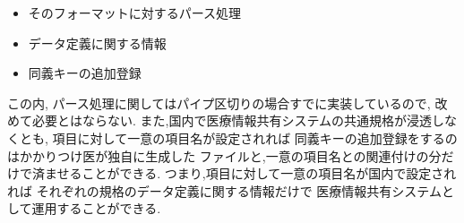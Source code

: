 	\begin{itemize}
		\item そのフォーマットに対するパース処理
		\item データ定義に関する情報
		\item  同義キーの追加登録
	\end{itemize}

	この内, パース処理に関してはパイプ区切りの場合すでに実装しているので,
	改めて必要とはならない.
	また,国内で医療情報共有システムの共通規格が浸透しなくとも,
	項目に対して一意の項目名が設定されれば
	同義キーの追加登録をするのはかかりつけ医が独自に生成した
	ファイルと,一意の項目名との関連付けの分だけで済ませることができる.
	つまり,項目に対して一意の項目名が国内で設定されれば
	それぞれの規格のデータ定義に関する情報だけで
	医療情報共有システムとして運用することができる.
